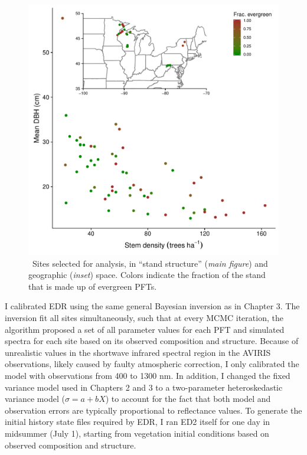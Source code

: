 \begin{figure}
  \centering
  \includegraphics[width=\textwidth]{figures/sites_both.pdf}
  \caption{\
    Sites selected for analysis, in ``stand structure'' (\textit{main figure}) and geographic (\textit{inset}) space.
    Colors indicate the fraction of the stand that is made up of evergreen PFTs.
  }\label{fig:sites}
\end{figure}
% 
% 

I calibrated EDR using the same general Bayesian inversion as in Chapter 3.
The inversion fit all sites simultaneously, such that at every MCMC iteration, the algorithm proposed a set of all parameter values for each PFT and simulated spectra for each site based on its observed composition and structure.
Because of unrealistic values in the shortwave infrared spectral region in the AVIRIS observations, likely caused by faulty atmospheric correction, I only calibrated the model with observations from 400 to 1300 nm.
In addition, I changed the fixed variance model used in Chapters 2 and 3 to a two-parameter heteroskedastic variance model ($\sigma = a + bX$) to account for the fact that both model and observation errors are typically proportional to reflectance values.
To generate the initial history state files required by EDR, I ran ED2 itself for one day in midsummer (July 1), starting from vegetation initial conditions based on observed composition and structure.


